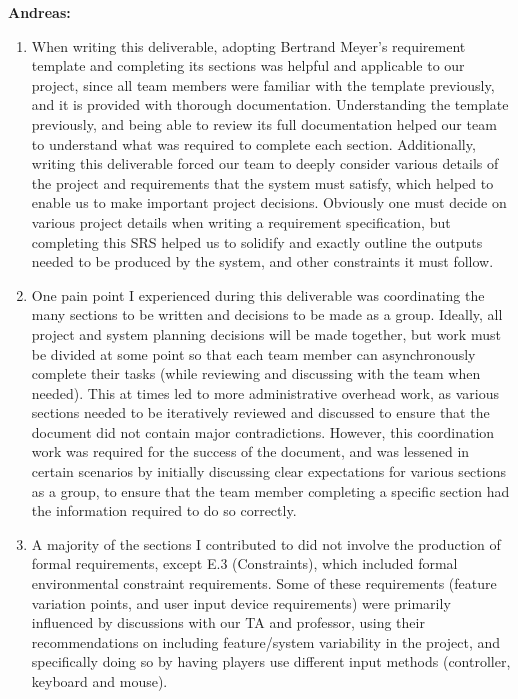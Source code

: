 \documentclass{scrreprt}
\theoremstyle{definition}
\begin{document}
	\textbf{Andreas:}
	
	\begin{enumerate}
		\item When writing this deliverable, adopting Bertrand Meyer's 
		requirement template and completing its sections was helpful and 
		applicable to our project, since all team members were familiar with 
		the template previously, and it is provided with thorough 
		documentation. Understanding the template previously, and being able to 
		review its full documentation helped our team to understand what was 
		required to complete each section. Additionally, writing this 
		deliverable forced our team to deeply consider various details of the 
		project and requirements that the system must satisfy, which helped to 
		enable us to make important project decisions. Obviously one must 
		decide on various project details when writing a requirement 
		specification, but completing this SRS helped us to solidify and 
		exactly outline the outputs needed to be produced by the system, and 
		other constraints it must follow.
		\item One pain point I experienced during this deliverable was 
		coordinating the many sections to be written and decisions to be made 
		as a group. Ideally, all project and system planning decisions will be 
		made together, but work must be divided at some point so that each team 
		member can asynchronously complete their tasks (while reviewing and 
		discussing with the team when needed). This at times led to more 
		administrative overhead work, as various sections needed to be 
		iteratively reviewed and discussed to ensure that the document did not 
		contain major contradictions. However, this coordination work was 
		required for the success of the document, and was lessened in certain 
		scenarios by initially discussing clear expectations for various 
		sections as a group, to ensure that the team member completing a 
		specific section had the information required to do so correctly.
		\item A majority of the sections I contributed to did not involve the 
		production of formal requirements, except E.3 (Constraints), which 
		included formal environmental constraint requirements. Some of these 
		requirements (feature variation points, and user input device 
		requirements) were primarily influenced by discussions with our TA and 
		professor, using their recommendations on including feature/system 
		variability in the project, and specifically doing so by having players 
		use different input methods (controller, keyboard and mouse). 

\end{enumerate}
\end{document}
